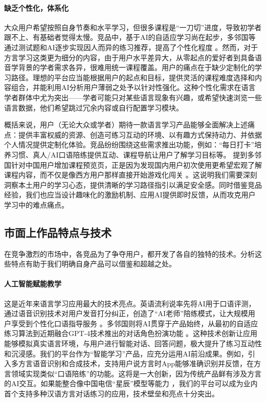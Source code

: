 \paragraph{缺乏个性化，体系化}
大众用户希望按照自身节奏和水平学习，但很多课程是“一刀切”进度，导致初学者跟不上、有基础者觉得太慢。竞品中，基于AI的自适应学习尚在起步，多邻国等通过测试题和AI逐步实现因人而异的练习推荐，提高了个性化程度 。然而，对于方言学习这类更为细分的内容，由于用户水平差异大，从零起点的爱好者到具备语音学背景的学者需求各异，很难用统一课程覆盖。用户的痛点在于缺少定制化的学习路径。理想的平台应当能根据用户的起点和目标，提供灵活的课程难度选择和内容组合，并能利用AI分析用户薄弱之处予以针对性强化。这种个性化需求在语言学者群体中尤为突出——学者可能只对某些语言现象有兴趣，或希望快速浏览一些语言数据，他们希望跳过冗余内容或自行配置学习模块。

概括来说，用户（无论大众或学者）期待一款语言学习产品能够全面解决上述痛点：提供丰富权威的资源、创造可练习互动的环境、以有趣方式保持动力、并依据个人情况提供定制化体验。竞品纷纷围绕这些需求推出功能，例如：“每日打卡”培养习惯、真人/AI口语陪练提供互动、课程导航让用户了解学习目标等。 提到多邻国针对中国用户增加课程预览页，正是因为发现国内用户初次使用更希望宏观了解课程内容，而不仅是像西方用户那样直接开始游戏化闯关 。这说明我们需要深刻洞察本土用户的学习心态，提供清晰的学习路径指引以满足安全感。同时借鉴竞品经验，我们也应当设计趣味化的激励机制、应用AI提供即时反馈，从而攻克用户学习中的难点痛点。

\subsection{市面上作品特点与技术}
在竞争激烈的市场中，各竞品为了争夺用户，都开发了各自的独特的技术。分析这些特点有助于我们明确自身产品可以借鉴和超越之处。
\paragraph{人工智能赋能教学}
这是近年来语言学习应用最大的技术亮点。英语流利说率先将AI用于口语评测，通过语音识别技术对用户发音打分纠正，创造了“AI老师”陪练模式，让大规模用户享受到个性化口语指导服务 。多邻国则将AI贯穿于产品始终，从最初的自适应练习算法到近期融合GPT-4技术推出的对话角色扮演功能  。这种技术创新让应用能够模拟真实语言环境，与用户进行智能对话、回答问题，极大提升了练习互动性和沉浸感。我们的平台作为“智能学习”产品，应充分运用AI前沿成果。例如，引入多方言语音识别和合成技术，支持用户说方言时App能够准确识别并反馈，在方言领域实现类似“口语陪练”的功能。这将是一大创新，因为传统产品鲜有涉及方言的AI交互。如果能整合像中国电信“星辰”模型等能力 ，我们的平台可以成为业内首个支持多种汉语方言对话练习的应用，技术壁垒和亮点十分突出。
